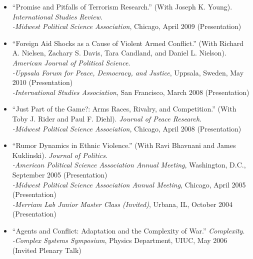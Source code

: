 \documentclass[10pt]{article}
\begin{document}
\begin{itemize}
\item ``Promise and Pitfalls of Terrorism Research.'' (With Joseph K. Young). \textit{International Studies Review}. 
   	\\ \indent \textit{-Midwest Political Science Association}, Chicago, April 2009 (Presentation)                                  

\item ``Foreign Aid Shocks as a Cause of Violent Armed Conflict.'' (With Richard A. Nielsen, Zachary S. Davis, Tara Candland, and Daniel L. Nielson). \textit{American Journal of Political Science}.  
   	\\ \indent \textit{-Uppsala Forum for Peace, Democracy, and Justice}, Uppsala, Sweden, May 2010 (Presentation)
   	\\ \indent \textit{-International Studies Association}, San Francisco, March 2008 (Presentation)

\item ``Just Part of the Game?: Arms Races, Rivalry, and Competition.'' (With Toby J. Rider and Paul F. Diehl). \textit{Journal of Peace Research}. 
    	\\ \indent \textit{-Midwest Political Science Association}, Chicago, April 2008 (Presentation)

\item ``Rumor Dynamics in Ethnic Violence.'' (With Ravi Bhavnani and James Kuklinski). \textit{Journal of Politics}. 
	\\ \indent \textit{-American Political Science Association Annual Meeting}, Washington, D.C., September 2005 (Presentation)
	\\ \indent \textit{-Midwest Political Science Association Annual Meeting}, Chicago, April 2005 (Presentation)
	\\ \indent \textit{-Merriam Lab Junior Master Class (Invited)}, Urbana, IL, October 2004 (Presentation)

\item ``Agents and Conflict: Adaptation and the Complexity of War.'' \textit{Complexity}. 
	\\ \indent \textit{-Complex Systems Symposium}, Physics Department, UIUC, May 2006 (Invited Plenary Talk)


\end{itemize}
\end{document}
